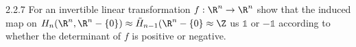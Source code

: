 \documentclass{article}
\begin{document}
\begin{exercise}{2.2.7}{\parindent}
  For an invertible linear transformation $f: \R^n \to \R^n$ show that
  the induced map on $H_n(\R^n, \R^n - \{0\}) \approx
  \tilde{H}_{n-1}(\R^n - \{0\} \approx \Z$ us $\mathbb{1}$ or
  $-\mathbb{1}$ according to whether the determinant of $f$ is
  positive or negative.
\end{exercise}
\begin{solution}{\parindent}



\end{solution}
\end{document}
